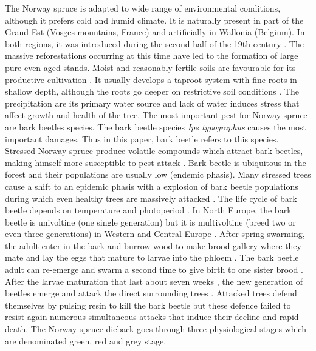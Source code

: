 \documentclass[3p,procedia]{elsarticle}
\begin{document}
The Norway spruce is adapted to wide range of environmental conditions, although it prefers cold and humid climate.
It is naturally present in part of the Grand-Est (Vosges mountains, France) and artificially in Wallonia (Belgium). In both regions, it was introduced during the second half of the 19th century \citep{Noirfalise_1975,guinier_trois_1959}.
The massive reforestations occurring at this time have led to the formation of large pure even-aged stands.
Moist and reasonably fertile soils are favourable for its productive cultivation \citep{horgan_guide_2003}.
It usually develops a taproot system with fine roots in shallow depth, although the roots go deeper on restrictive soil conditions \citep{puhe_roots_2003}.   
The precipitation are its primary water source \citep{tjoelker_outline_2007} and lack of water induces stress that affect growth and health of the tree. 
The most important pest for Norway spruce are bark beetles species.
The bark beetle species \textit{Ips typographus} causes the most important damages.
Thus in this paper, bark beetle refers to this species.
Stressed Norway spruce produce volatile compounds which attract bark beetles, making himself more susceptible to pest attack \citep{netherer_waterlimiting_2015,netherer_interactions_2021}.
Bark beetle is ubiquitous in the forest and their populations are usually low (endemic phasis).
Many stressed trees  cause a shift to an epidemic phasis with a explosion of bark beetle populations during which even healthy trees are massively attacked \citep{kautz_individual_2014}.
The life cycle of bark beetle depends on temperature and photoperiod \citep{annila_influence_1969, baier_phenipscomprehensive_2007}.
In North Europe, the bark beetle is univoltine (one single generation) but it is multivoltine (breed two or even three generations) in Western and Central Europe \citep{annila_influence_1969}.
After spring swarming, the adult enter in the bark and burrow wood to make brood gallery where they mate and lay the eggs that mature to larvae into the phloem \citep{hlasny_bark_2021}.
The bark beetle adult can re-emerge and swarm a second time to give birth to one sister brood \citep{zolubas_1995}.
After the larvae maturation that last about seven weeks \citep{baier_phenipscomprehensive_2007}, the new generation of beetles emerge and attack the direct surrounding trees \citep{zolubas_1995}.
Attacked trees defend themselves by pulsing resin to kill the bark beetle but these defence failed to resist again numerous simultaneous attacks that induce their decline and rapid death.
The Norway spruce dieback goes through three physiological stages which are denominated green, red and grey stage.
\end{document}
